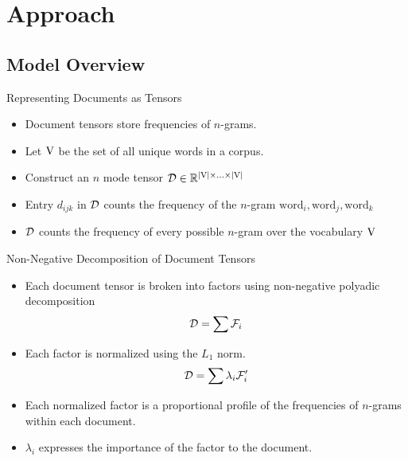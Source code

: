 \documentclass[handout]{beamer}
\begin{document}
\section{Approach}
\subsection{Model Overview}
\begin{frame}{Representing Documents as Tensors}
  \begin{itemize}[<+->]
  \item Document tensors store frequencies of $n$-grams.
  \item Let $\mathrm{V}$ be the set of all unique words in a corpus.
  \item Construct an $n$ mode tensor $\mathcal{D} \in \mathbb{R}^{|\mathrm{V}|
      \times \ldots \times |\mathrm{V}|}$
  \item Entry $d_{ijk}$ in $\mathcal{D}$ counts the frequency of the $n$-gram
    $\mathrm{word}_i, \mathrm{word}_j, \mathrm{word}_k$
  \item $\mathcal{D}$ counts the frequency of every possible $n$-gram
    over the vocabulary $\mathrm{V}$
  \end{itemize}
\end{frame}



\begin{frame}{Non-Negative Decomposition of Document Tensors}
  \begin{itemize}[<+->]
    \item Each document tensor is broken into factors using non-negative polyadic
      decomposition
      \[
          \mathcal{D} = \sum \mathcal{F}_i 
        \]
      \item Each factor is normalized using the $L_1$ norm.
        \[
          \mathcal{D} = \sum \lambda_i \mathcal{F}'_i
        \]
      \item Each normalized factor is a proportional profile of the
        frequencies of $n$-grams within each document.
      \item $\lambda_i$ expresses the importance of the factor to the
        document.
  \end{itemize}
\end{frame}
\end{document}
